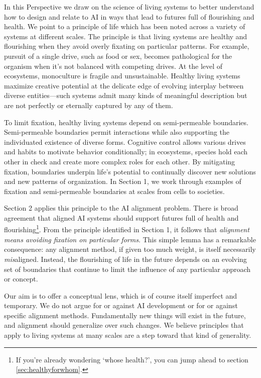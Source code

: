 \documentclass[11pt]{article}
\begin{document}
\noindent


In this Perspective we draw on the science of living systems to better understand how to design and relate to AI in ways that lead to futures full of flourishing and health. We point to a principle of life which has been noted across a variety of systems at different scales. The principle is that living systems are healthy and flourishing when they avoid overly fixating on particular patterns. For example, pursuit of a single drive, such as food or sex, becomes pathological for the organism when it's not balanced with competing drives. At the level of ecosystems, monoculture is fragile and unsustainable. Healthy living systems maximize creative potential at the delicate edge of evolving interplay between diverse entities---such systems admit many kinds of meaningful description but are not perfectly or eternally captured by any of them. 

To limit fixation, healthy living systems depend on semi-permeable boundaries. Semi-permeable boundaries permit interactions while also supporting the individuated existence of diverse forms. Cognitive control allows various drives and habits to motivate behavior conditionally; in ecosystems, species hold each other in check and create more complex roles for each other. By mitigating fixation, boundaries underpin life's potential to continually discover new solutions and new patterns of organization. In Section 1, we work through examples of fixation and semi-permeable boundaries at scales from cells to societies.

Section 2 applies this principle to the AI alignment problem. There is broad agreement that aligned AI systems should support futures full of health and flourishing\footnote{If you're already wondering `whose health?', you can jump ahead to section \ref{sec:healthyforwhom}.}. From the principle identified in Section 1, it follows that \textit{alignment means avoiding fixation on particular forms}. This simple lemma has a remarkable consequence: any alignment method, if given too much weight, is itself necessarily \textit{mis}aligned. Instead, the flourishing of life in the future depends on an evolving set of boundaries that continue to limit the influence of any particular approach or concept.

Our aim is to offer a conceptual lens, which is of course itself imperfect and temporary. We do not argue for or against AI development or for or against specific alignment methods. Fundamentally new things will exist in the future, and alignment should generalize over such changes. We believe principles that apply to living systems at many scales are a step toward that kind of generality.
\end{document}
